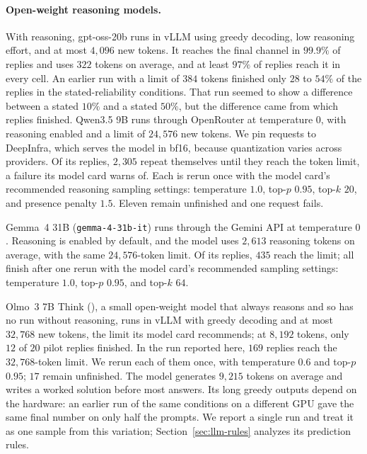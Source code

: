\paragraph{Open-weight reasoning models.}
With reasoning, gpt-oss-20b runs in vLLM using greedy decoding, low reasoning effort, and at most $4{,}096$ new tokens. It reaches the final channel in $99.9\%$ of replies and uses $322$ tokens on average, and at least $97\%$ of replies reach it in every cell. An earlier run with a limit of $384$ tokens finished only $28$ to $54\%$ of the replies in the stated-reliability conditions. That run seemed to show a difference between a stated $10\%$ and a stated $50\%$, but the difference came from which replies finished. Qwen3.5 9B runs through OpenRouter at temperature $0$, with reasoning enabled and a limit of $24{,}576$ new tokens. We pin requests to DeepInfra, which serves the model in bf16, because quantization varies across providers. Of its replies, $2{,}305$ repeat themselves until they reach the token limit, a failure its model card warns of. Each is rerun once with the model card's recommended reasoning sampling settings: temperature $1.0$, top-$p$ $0.95$, top-$k$ $20$, and presence penalty $1.5$. Eleven remain unfinished and one request fails.

Gemma~4 31B (\texttt{gemma-4-31b-it}) runs through the Gemini API at temperature $0$. Reasoning is enabled by default, and the model uses $2{,}613$ reasoning tokens on average, with the same $24{,}576$-token limit. Of its replies, $435$ reach the limit; all finish after one rerun with the model card's recommended sampling settings: temperature $1.0$, top-$p$ $0.95$, and top-$k$ $64$.

Olmo~3 7B Think (), a small open-weight model that always reasons and so has no run without reasoning, runs in vLLM with greedy decoding and at most $32{,}768$ new tokens, the limit its model card recommends; at $8{,}192$ tokens, only $12$ of $20$ pilot replies finished. In the run reported here, $169$ replies reach the $32{,}768$-token limit. We rerun each of them once, with temperature $0.6$ and top-$p$ $0.95$; $17$ remain unfinished. The model generates $9{,}215$ tokens on average and writes a worked solution before most answers. Its long greedy outputs depend on the hardware: an earlier run of the same conditions on a different GPU gave the same final number on only half the prompts. We report a single run and treat it as one sample from this variation; Section~\ref{sec:llm-rules} analyzes its prediction rules.

